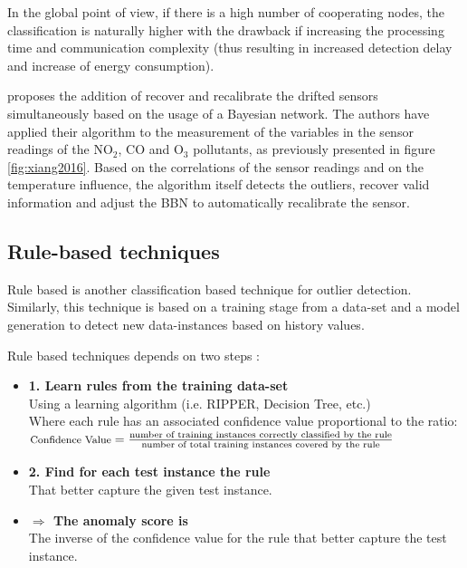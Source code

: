 In the global point of view, if there is a high number of cooperating nodes, the classification is naturally higher with the drawback if increasing the processing time and communication complexity (thus resulting in increased detection delay and increase of energy consumption).

\cite{class:xiang:2016} proposes the addition of recover and recalibrate the drifted sensors simultaneously based on the usage of a Bayesian network. 
The authors have applied their algorithm to the measurement of the variables in the sensor readings of the NO$_2$, CO and O$_3$ pollutants, as previously presented in figure \ref{fig:xiang2016}.
Based on the correlations of the sensor readings and on the temperature influence, the algorithm itself detects the outliers, recover valid information and adjust the BBN to automatically recalibrate the sensor.




\subsection{Rule-based techniques}
\label{subsec:rule}
Rule based is another classification based technique for outlier detection. Similarly, this technique is based on a training stage from a data-set and a model generation to detect new data-instances based on history values.

Rule based techniques depends on two steps \cite{gen:chandola:2009}:

\begin{itemize}
	\item \textbf{1. Learn rules from the training data-set}\\
	Using a learning algorithm (i.e. RIPPER, Decision Tree, etc.)\\
	Where each rule has an associated confidence value 	proportional to the ratio:\\
	{\centering	$\text{\footnotesize Confidence Value} = \frac{\text{number of training instances correctly classified by the rule}}{\text{number of total training instances covered by the rule}}$
}
		
	\item \textbf{2. Find for each test instance the rule}\\
	That better capture the given test instance.
	
	\item \textbf{$\Rightarrow$ The anomaly score is}\\
	The inverse of the confidence value for the rule that better capture the test instance.

\end{itemize}

